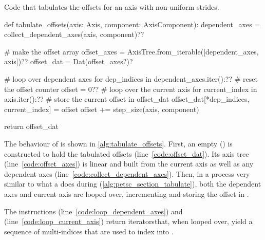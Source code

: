 \documentclass[thesis]{subfiles}
\begin{document}
\begin{algorithm}
  \caption{
    Code that tabulates the offsets for an axis with non-uniform strides.
  }

  \begin{flushright}
    \begin{minipage}{.96\textwidth}
      \begin{pyalg2}
        def tabulate_offsets(axis: Axis, component: AxisComponent):
          dependent_axes = collect_dependent_axes(axis, component)?\label{code:collect_dependent_axes}?

          # make the offset array
          offset_axes = AxisTree.from_iterable([dependent_axes, axis])?\label{code:offset_axes}?
          offset_dat = Dat(offset_axes?\label{code:offset_dat})?

          # loop over dependent axes
          for dep_indices in dependent_axes.iter():?\label{code:loop_dependent_axes}?
            # reset the offset counter
            offset = 0?\label{code:reset_offset}?
            # loop over the current axis
            for current_index in axis.iter():?\label{code:loop_current_axis}?
              # store the current offset in offset_dat
              offset_dat[*dep_indices, current_index] = offset
              offset += step_size(axis, component)

          return offset_dat
      \end{pyalg2}
    \end{minipage}
  \end{flushright}
  \label{alg:tabulate_offsets}
\end{algorithm}

The behaviour of  is shown in \cref{alg:tabulate_offsets}.
First, an empty  () is constructed to hold the tabulated offsets (line~\ref{code:offset_dat}).
Its axis tree (line~\ref{code:offset_axes}) is linear and built from the current axis as well as any dependent axes (line~\ref{code:collect_dependent_axes}).
Then, in a process very similar to what a  does during  (\cref{alg:petsc_section_tabulate}), both the dependent axes and current axis are looped over, incrementing and storing the offset in .

The instructions  (line~\ref{code:loop_dependent_axes}) and  (line~\ref{code:loop_current_axis}) return iterators\footnotemark that, when looped over, yield a sequence of multi-indices that are used to index into .
\end{document}
